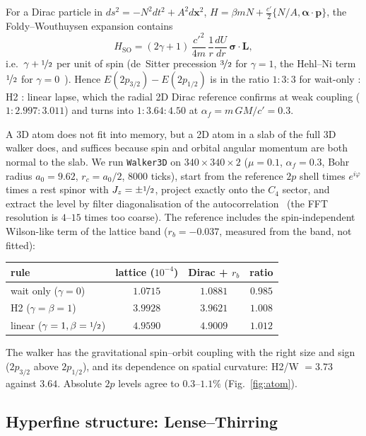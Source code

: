\documentclass[twocolumn,showpacs,preprintnumbers,amsmath,amssymb]{revtex4-2}
\newcommand{\cpr}{c'}
\newcommand{\pvec}{\mathbf{p}}
\newcommand{\vsig}{\boldsymbol{\sigma}}
\begin{document}
For a Dirac particle in $ds^{2}=-N^{2}dt^{2}+A^{2}d\mathbf{x}^{2}$,
$H=\beta mN+\tfrac{\cpr}{2}\{N/A,\boldsymbol{\alpha}\cdot\pvec\}$, the
Foldy--Wouthuysen expansion contains
\begin{equation}
  H_{\mathrm{SO}}=(2\gamma+1)\,\frac{\cpr^{2}}{4m}\,\frac1r\frac{dU}{dr}\,
  \vsig\cdot\mathbf{L},
\end{equation}
i.e.\ $\gamma+\nicefrac12$ per unit of spin (de~Sitter precession $\nicefrac32$
for $\gamma=1$, the Hehl--Ni term $\nicefrac12$ for $\gamma=0$~\cite{hehl1990}).
Hence $E(2p_{3/2})-E(2p_{1/2})$ is in the ratio $1:3:3$ for wait-only : H2 :
linear lapse, which the radial 2D Dirac reference confirms at weak coupling
($1:2.997:3.011$) and turns into $1:3.64:4.50$ at $\alpha_f=m\,GM/\cpr=0.3$.

A 3D atom does not fit into memory, but a 2D atom in a slab of the full 3D
walker does, and suffices because spin and orbital angular momentum are both
normal to the slab.
We run \texttt{Walker3D} on $340\times340\times2$ ($\mu=0.1$, $\alpha_f=0.3$,
Bohr radius $a_0=9.62$, $r_c=a_0/2$, $8000$ ticks), start from the reference
$2p$ shell times $e^{i\varphi}$ times a rest spinor with $J_z=\pm\nicefrac12$,
project exactly onto the $C_4$ sector, and extract the level by filter
diagonalisation of the autocorrelation~\cite{mandelshtam1997} (the FFT
resolution is $4$--$15$ times too coarse).
The reference includes the spin-independent Wilson-like term of the lattice
band ($r_b=-0.037$, measured from the band, not fitted):

\begin{center}
\begin{tabular}{lccc}
\toprule
rule & lattice ($10^{-4}$) & Dirac + $r_b$ & ratio\\
\midrule
wait only ($\gamma=0$) & $1.0715$ & $1.0881$ & $0.985$\\
H2 ($\gamma=\beta=1$) & $3.9928$ & $3.9621$ & $1.008$\\
linear ($\gamma=1,\beta=\nicefrac12$) & $4.9590$ & $4.9009$ & $1.012$\\
\bottomrule
\end{tabular}
\end{center}

\noindent
The walker has the gravitational spin--orbit coupling with the right size and
sign ($2p_{3/2}$ above $2p_{1/2}$), and its dependence on spatial curvature:
H2/W $=3.73$ against $3.64$.
Absolute $2p$ levels agree to $0.3$--$1.1\%$ (Fig.~\ref{fig:atom}).

\subsection{Hyperfine structure: Lense--Thirring}
\end{document}
